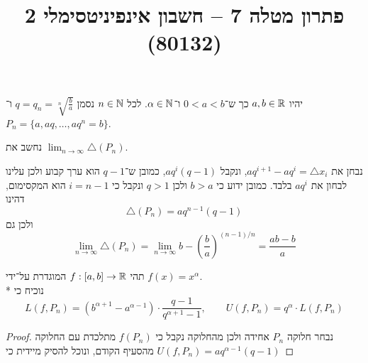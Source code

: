 
\usepackage{tikz}
\DeclareMathOperator\arcsinh{arcsinh}
\title{פתרון מטלה 7 – חשבון אינפיניטסימלי 2 (80132)}


\maketitle
\maketitleprint{}

\Question{}
יהיו $a, b \in \mathbb{R}$ כך ש־$0 < a < b$ ו־$\alpha \in \mathbb{N}$. לכל $n \in \mathbb{N}$ נסמן $q = q_n = \sqrt[n]{\frac{b}{a}}$ ו־$P_n = \{a, aq, \dots, aq^n = b\}$.

\Subquestion{}
נחשב את $\lim_{n \to \infty} \triangle(P_n)$.

נבחן את $aq^{i + 1} - aq^i = \triangle x_i$, ונקבל $aq^i (q - 1)$, כמובן ש־$q - 1$ הוא ערך קבוע ולכן עלינו לבחון את $aq^i$ בלבד. כמובן ידוע כי $b > a$ ולכן $q > 1$ ונקבל כי $i = n - 1$ הוא המקסימום, דהינו
\[
	\triangle(P_n) = aq^{n - 1} (q - 1)
\]
ולכן גם
\[
	\lim_{n \to \infty} \triangle(P_n)
	= \lim_{n \to \infty} b - {(\frac{b}{a})}^{(n-1)/n}
	= \frac{ab - b}{a}
\]

\Subquestion{}
תהי $f : [a, b] \to \mathbb{R}$ המוגדרת על־ידי $f(x) = x^\alpha$. \\*
נוכיח כי
\[
	L(f, P_n) = (b^{\alpha + 1} - a^{\alpha - 1}) \cdot \frac{q - 1}{q^{\alpha + 1} - 1},
	\qquad
	U(f, P_n) = q^\alpha \cdot L(f, P_n)
\]
\begin{proof}
	נבחר חלוקה $P_n$ אחידה ולכן מהחלוקה נקבל כי $f(P_n)$ מתלכדת עם החלוקה מהסעיף הקודם, ונוכל להסיק מיידית כי $U(f, P_n) = aq^{\alpha - 1} (q - 1)$
\end{proof}


